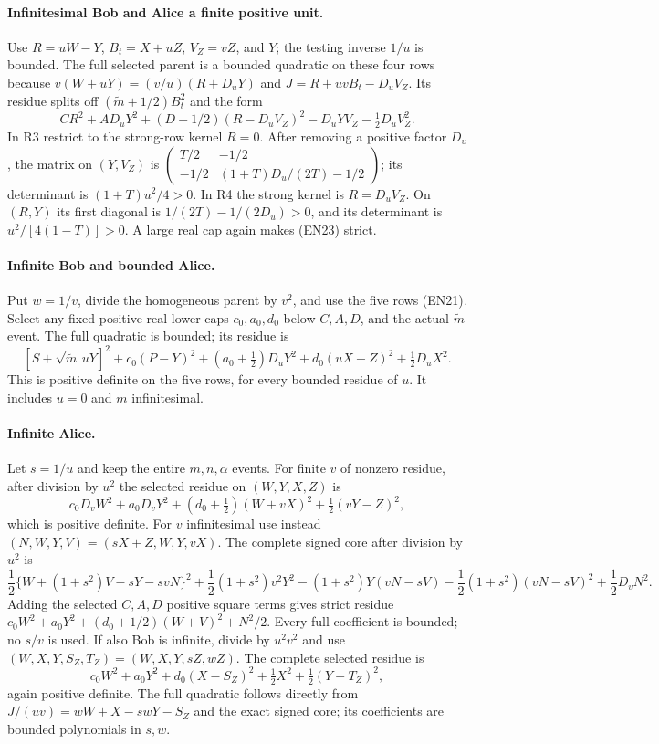 \paragraph{Infinitesimal Bob and Alice a finite positive unit.}
Use $R=uW-Y$, $B_t=X+uZ$, $V_Z=vZ$, and $Y$; the testing inverse
$1/u$ is bounded. The full selected parent is a bounded quadratic
on these four rows because
$v(W+uY)=(v/u)(R+D_uY)$ and
$J=R+uvB_t-D_uV_Z$.
Its residue splits off $(\widetilde m+1/2)B_t^2$ and the form
\[
CR^2+AD_uY^2+(D+1/2)(R-D_uV_Z)^2
-D_uYV_Z-\tfrac12D_uV_Z^2.                            \tag{EN23}
\]
In R3 restrict to the strong-row kernel $R=0$.
After removing a positive factor $D_u$, the matrix on $(Y,V_Z)$ is
$\left(\begin{smallmatrix}T/2&-1/2\\-1/2&
(1+T)D_u/(2T)-1/2\end{smallmatrix}\right)$;
its determinant is $(1+T)u^2/4>0$.
In R4 the strong kernel is $R=D_uV_Z$.
On $(R,Y)$ its first diagonal is $1/(2T)-1/(2D_u)>0$,
and its determinant is $u^2/[4(1-T)]>0$.
A large real cap again makes (EN23) strict.

\paragraph{Infinite Bob and bounded Alice.}
Put $w=1/v$, divide the homogeneous parent by $v^2$, and use
the five rows (EN21). Select any fixed positive real lower caps
$c_0,a_0,d_0$ below $C,A,D$, and the actual $\widetilde m$ event.
The full quadratic is bounded; its residue is
\[
[S+\sqrt{\widetilde m}\,uY]^2+
c_0(P-Y)^2+(a_0+\tfrac12)D_uY^2+
d_0(uX-Z)^2+\tfrac12D_uX^2.                           \tag{EN24}
\]
This is positive definite on the five rows, for every bounded
residue of $u$. It includes $u=0$ and $m$ infinitesimal.

\paragraph{Infinite Alice.}
Let $s=1/u$ and keep the entire $m,n,\alpha$ events.
For finite $v$ of nonzero residue, after division by $u^2$
the selected residue on $(W,Y,X,Z)$ is
\[
c_0D_vW^2+a_0D_vY^2+
(d_0+\tfrac12)(W+vX)^2+\tfrac12(vY-Z)^2,
\]
which is positive definite. For $v$ infinitesimal use instead
$(N,W,Y,V)=(sX+Z,W,Y,vX)$.
The complete signed core after division by $u^2$ is
\[
\frac12\{W+(1+s^2)V-sY-svN\}^2
+\frac12(1+s^2)v^2Y^2
-(1+s^2)Y(vN-sV)-\frac12(1+s^2)(vN-sV)^2
+\frac12D_vN^2 .
\]
Adding the selected $C,A,D$ positive square terms gives strict residue
$c_0W^2+a_0Y^2+(d_0+1/2)(W+V)^2+N^2/2$.
Every full coefficient is bounded; no $s/v$ is used.
If also Bob is infinite, divide by $u^2v^2$ and use
$(W,X,Y,S_Z,T_Z)=(W,X,Y,sZ,wZ)$.
The complete selected residue is
\[
c_0W^2+a_0Y^2+d_0(X-S_Z)^2+\tfrac12X^2
+\tfrac12(Y-T_Z)^2,                                   \tag{EN25}
\]
again positive definite. The full quadratic follows directly from
$J/(uv)=wW+X-swY-S_Z$ and the exact signed core;
its coefficients are bounded polynomials in $s,w$.

